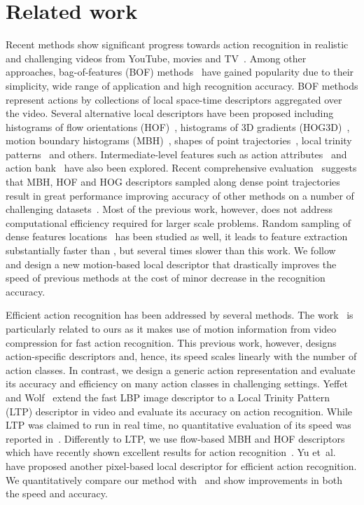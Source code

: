 \documentclass[10pt,twocolumn,letterpaper]{article}
\begin{document}
\section{Related work}
\label{sec:relatedwork}
Recent methods show significant progress towards action
recognition in realistic and challenging videos from YouTube,
movies and
TV~\cite{Laptev08,Laptev07,Liu11,Niebles10,Rodriguez08,Sadanand12,Wang12}.
Among other approaches, bag-of-features (BOF)
methods~\cite{Dollar05,Laptev05,Schuldt04} have gained
popularity due to their simplicity, wide range of application
and high recognition accuracy.
BOF methods represent actions by collections of local space-time
descriptors aggregated over the video.
Several alternative local descriptors have been proposed
including histograms of flow orientations (HOF)~\cite{Laptev08},
histograms of 3D gradients
(HOG3D)~\cite{klaser2008spatio,Scovanner07}, motion boundary
histograms (MBH)~\cite{Dalal06,Wang12}, shapes of point
trajectories~\cite{Matikainen09,Messing09,Wang12}, local trinity
patterns~\cite{Kliper12,Yeffet09} and others. Intermediate-level
features such as action attributes~\cite{Liu11} and action
bank~\cite{Sadanand12} have also been explored. Recent
comprehensive evaluation~\cite{Wang12} suggests that MBH, HOF
and HOG descriptors sampled along dense point trajectories
result in great performance improving accuracy of other
methods on a number of challenging datasets~\cite{Wang12}. Most
of the previous work, however, does not address computational
efficiency required for larger scale problems. Random sampling of dense features locations~\cite{Feng13} has been studied as well, it leads to feature extraction substantially faster than \cite{Wang12}, but several times slower than this work. We
follow~\cite{Wang12} and design a new motion-based local
descriptor that drastically improves the speed of previous
methods at the cost of minor decrease in the recognition
accuracy.

Efficient action recognition has been addressed by several
methods. The work~\cite{mpeg3,mpeg2,mpeg1} is particularly
related to ours as it makes use of motion information from video
compression for fast action recognition. This previous work,
however, designs action-specific descriptors and, hence, its
speed scales linearly with the number of action classes. In
contrast, we design a generic action representation and evaluate
its accuracy and efficiency on many action classes in
challenging settings.
Yeffet and Wolf~\cite{Yeffet09} extend the fast LBP image
descriptor to a Local Trinity Pattern (LTP) descriptor in video
and evaluate its accuracy on action recognition. While LTP was
claimed to run in real time, no quantitative evaluation of its
speed was reported in~\cite{Yeffet09}. Differently to LTP, we
use flow-based MBH and HOF descriptors which have recently shown
excellent results for action recognition~\cite{Wang12}. Yu
et~al.~\cite{Yu10} have proposed another pixel-based local
descriptor for efficient action recognition. We quantitatively
compare our method with~\cite{Yu10} and show improvements in
both the speed and accuracy.
\end{document}
